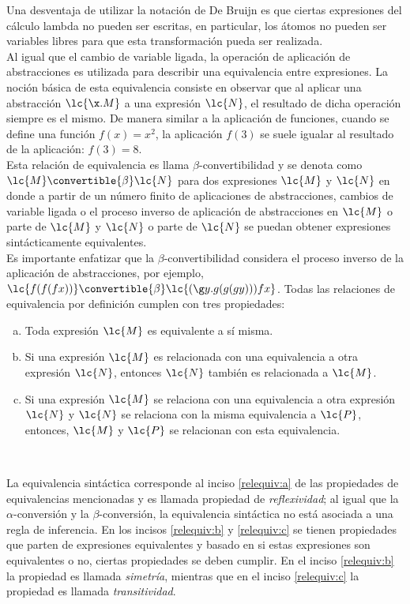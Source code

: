 Una desventaja de utilizar la notación de De Bruijn es que ciertas expresiones del cálculo lambda no pueden ser escritas, en particular, los átomos no pueden ser variables libres para que esta transformación pueda ser realizada. \\

Al igual que el cambio de variable ligada, la operación de aplicación de abstracciones es utilizada para describir una equivalencia entre expresiones. La noción básica de esta equivalencia consiste en observar que al aplicar una abstracción \(\lc{\x.M}\) a una expresión \(\lc{N}\), el resultado de dicha operación siempre es el mismo. De manera similar a la aplicación de funciones, cuando se define una función \(f(x)=x^{2}\), la aplicación \(f(3)\) se suele igualar al resultado de la aplicación: \(f(3) = 8\). \\

Esta relación de equivalencia es llama \(\beta\)-convertibilidad y se denota como \(\lc{M} \convertible{\beta} \lc{N}\) para dos expresiones \(\lc{M}\) y \(\lc{N}\) en donde a partir de un número finito de aplicaciones de abstracciones, cambios de variable ligada o el proceso inverso de aplicación de abstracciones en \(\lc{M}\) o parte de \(\lc{M}\) y \(\lc{N}\) o parte de \(\lc{N}\) se puedan obtener expresiones sintácticamente equivalentes. \\

Es importante enfatizar que la \(\beta\)-convertibilidad considera el proceso inverso de la aplicación de abstracciones, por ejemplo, \(\lc{f(f(f x))} \convertible{\beta} \lc{(\g y.g(g(g y)))f x}\). Todas las relaciones de equivalencia por definición cumplen con tres propiedades: \\

\begin{enumerate}[a.]
\item Toda expresión \(\lc{M}\) es equivalente a sí misma. \label{relequiv:a}
\item Si una expresión \(\lc{M}\) es relacionada con una equivalencia a otra expresión \(\lc{N}\), entonces \(\lc{N}\) también es relacionada a \(\lc{M}\). \label{relequiv:b}
\item Si una expresión \(\lc{M}\) se relaciona con una equivalencia a otra expresión \(\lc{N}\) y \(\lc{N}\) se relaciona con la misma equivalencia a \(\lc{P}\), entonces, \(\lc{M}\) y \(\lc{P}\) se relacionan con esta equivalencia. \label{relequiv:c}
\end{enumerate} \

La equivalencia sintáctica corresponde al inciso \ref{relequiv:a} de las propiedades de equivalencias mencionadas y es llamada propiedad de \emph{reflexividad}; al igual que la \(\alpha\)-conversión y la \(\beta\)-conversión, la equivalencia sintáctica no está asociada a una regla de inferencia. En los incisos \ref{relequiv:b} y \ref{relequiv:c} se tienen propiedades que parten de expresiones equivalentes y basado en si estas expresiones son equivalentes o no, ciertas propiedades se deben cumplir. En el inciso \ref{relequiv:b} la propiedad es llamada \emph{simetría}, mientras que en el inciso \ref{relequiv:c} la propiedad es llamada \emph{transitividad}. \\

